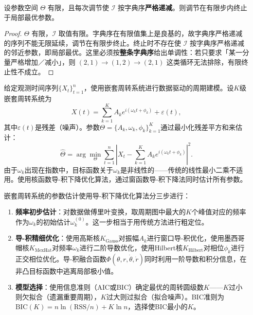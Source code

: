 \begin{proposition}[结构指标调节的有限收敛]\label{prop:data_structure_metric_convergence}
设参数空间 $\Theta$ 有限，且每次调节使 $\mathcal I$ 按字典序\textbf{严格递减}。则调节在有限步内终止于局部最优参数。
\end{proposition}

\begin{proof}
$\Theta$ 有限，$\mathcal I$ 取值有限。字典序在有限值集上是良基的，故字典序严格递减的序列不能无限延续，调节在有限步终止。终止时不存在使 $\mathcal I$ 按字典序严格递减的邻近参数，即局部最优。这里必须按\textbf{整条字典序}给出单调性：若只要求「某一分量严格增加／减小」，则 $(2,1)\to(1,2)\to(2,1)$ 这类循环无法排除，有限终止性不成立。
\end{proof}

\begin{definition}[嵌套周转系统的数据拟合]\label{def:nested_epicycle_fitting}
给定观测时间序列$\{X_t\}_{t=1}^{n}$，使用嵌套周转系统进行数据驱动的周期建模。设$K$级嵌套周转系统为
\[
X(t) = \sum_{k=1}^{K} A_k e^{i(\omega_k t + \phi_k)} + \varepsilon(t),
\]
其中$\varepsilon(t)$是残差（噪声）。参数$\Theta = \{A_k, \omega_k, \phi_k\}_{k=1}^{K}$通过最小化残差平方和来估计：
\[
\hat{\Theta} = \arg\min_{\Theta} \sum_{t=1}^{n} \left| X_t - \sum_{k=1}^{K} A_k e^{i(\omega_k t + \phi_k)} \right|^2.
\]
由于$\omega_k$出现在指数中，目标函数关于$\omega_k$是非线性的——传统的线性最小二乘不适用。使用核函数导-积下降优化算法，通过窗函数导-积下降法同时估计所有参数。
\end{definition}

\begin{proposition}[导-积下降优化的参数估计]\label{prop:kdi_parameter_estimation}
嵌套周转系统的参数估计使用导-积下降优化算法分三步进行：
\begin{enumerate}[label=(\roman*)]
    \item \textbf{频率初步估计}：对数据做傅里叶变换，取周期图中最大的$K$个峰值对应的频率作为$\omega_k$的初始估计$\omega_k^{(0)}$。这一步相当于用传统方法进行粗定位。
    \item \textbf{导-积精细优化}：使用高斯核$K_{\text{Gauss}}$对振幅$A_k$进行窗口导-积优化，使用墨西哥帽核$K_{\text{MexHat}}$对频率$\omega_k$进行二阶导数优化，使用Hilbert核$K_{\text{Hilbert}}$对相位$\phi_k$进行正交相位优化。导-积融合函数$\Phi(\theta, r, \dot{\theta}, \dot{r})$同时利用一阶导数和积分信息，在非凸目标函数中逃离局部极小值。
    \item \textbf{模型选择}：使用信息准则（AIC或BIC）确定最优的周转圆级数$K$——$K$过小则欠拟合（遗漏重要周期），$K$过大则过拟合（拟合噪声）。BIC准则为$\text{BIC}(K) = n\ln(\text{RSS}/n) + K\ln n$，选择使BIC最小的$K$。
\end{enumerate}
\end{proposition}

